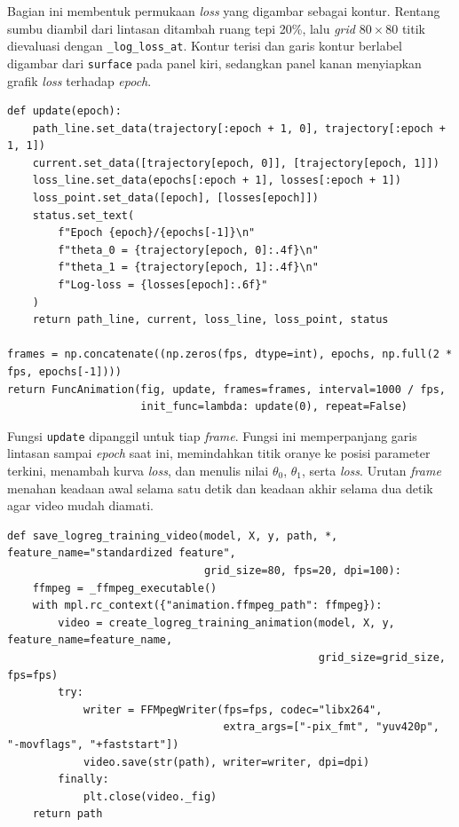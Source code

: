 Bagian ini membentuk permukaan \textit{loss} yang digambar sebagai kontur.
Rentang sumbu diambil dari lintasan ditambah ruang tepi 20\%, lalu
\textit{grid} $80\times 80$ titik dievaluasi dengan \texttt{\_log\_loss\_at}.
Kontur terisi dan garis kontur berlabel digambar dari \texttt{surface} pada
panel kiri, sedangkan panel kanan menyiapkan grafik \textit{loss} terhadap
\textit{epoch}.

\begin{lstlisting}
def update(epoch):
    path_line.set_data(trajectory[:epoch + 1, 0], trajectory[:epoch + 1, 1])
    current.set_data([trajectory[epoch, 0]], [trajectory[epoch, 1]])
    loss_line.set_data(epochs[:epoch + 1], losses[:epoch + 1])
    loss_point.set_data([epoch], [losses[epoch]])
    status.set_text(
        f"Epoch {epoch}/{epochs[-1]}\n"
        f"theta_0 = {trajectory[epoch, 0]:.4f}\n"
        f"theta_1 = {trajectory[epoch, 1]:.4f}\n"
        f"Log-loss = {losses[epoch]:.6f}"
    )
    return path_line, current, loss_line, loss_point, status

frames = np.concatenate((np.zeros(fps, dtype=int), epochs, np.full(2 * fps, epochs[-1])))
return FuncAnimation(fig, update, frames=frames, interval=1000 / fps,
                     init_func=lambda: update(0), repeat=False)
\end{lstlisting}

Fungsi \texttt{update} dipanggil untuk tiap \textit{frame}. Fungsi ini
memperpanjang garis lintasan sampai \textit{epoch} saat ini, memindahkan titik
oranye ke posisi parameter terkini, menambah kurva \textit{loss}, dan menulis
nilai $\theta_0$, $\theta_1$, serta \textit{loss}. Urutan \textit{frame}
menahan keadaan awal selama satu detik dan keadaan akhir selama dua detik agar
video mudah diamati.

\begin{lstlisting}
def save_logreg_training_video(model, X, y, path, *, feature_name="standardized feature",
                               grid_size=80, fps=20, dpi=100):
    ffmpeg = _ffmpeg_executable()
    with mpl.rc_context({"animation.ffmpeg_path": ffmpeg}):
        video = create_logreg_training_animation(model, X, y, feature_name=feature_name,
                                                 grid_size=grid_size, fps=fps)
        try:
            writer = FFMpegWriter(fps=fps, codec="libx264",
                                  extra_args=["-pix_fmt", "yuv420p", "-movflags", "+faststart"])
            video.save(str(path), writer=writer, dpi=dpi)
        finally:
            plt.close(video._fig)
    return path
\end{lstlisting}

